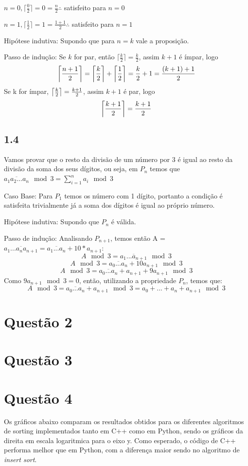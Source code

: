 \documentclass{article}
\DeclarePairedDelimiter\ceil{\lceil}{\rceil}
\begin{document}
$n=0,\lceil\frac{0}{2}\rceil=0=\frac{n}{2}\therefore$ satisfeito para $n=0$

$n=1,\lceil\frac{1}{2}\rceil=1=\frac{1+1}{2}\therefore$ satisfeito para $n=1$

Hipótese indutiva: Supondo que para $n=k$ vale a proposição.

Passo de indução: Se $k$ for par, então $\lceil\frac{k}{2} \rceil = \frac{k}{2}$, assim
$k+1$ é ímpar, logo
$$
\ceil*{\frac{n+1}{2}} = \ceil*{\frac{k}{2}} + \ceil*{\frac{1}{2}} =\frac{k}{2}+1 = \frac{(k+1)+1}{2}
$$
Se k for ímpar, $\ceil*{\frac{k}{2}} = \frac{k+1}{2}$, assim $k+1$ é par, logo
$$\ceil*{\frac{k+1}{2}}=\frac{k+1}{2}$$


\subsection*{1.4}
Vamos provar que o resto da divisão de um número por 3 é igual ao resto da divisão da soma
dos seus dígitos, ou seja, em $P_n$ temos que $\overline{a_1a_2...a_n} \mod 3 = \sum_{i=1}^n{a_i} \mod 3$

Caso Base: Para $P_1$ temos os número com 1 dígito, portanto a condição é satisfeita trivialmente já
a soma dos dígitos é igual ao próprio número.

Hipótese indutiva: Supondo que $P_n$ é válida.

Passo de indução: Analisando $P_{n+1}$, temos então A = $\overline{a_1...a_na_{n+1}} = \overline{a_1...a_n}+10*a_{n+1}$:
$$A \mod 3 = \overline{a_1...a_{n+1}} \mod 3$$
$$A \mod 3 = \overline{a_0...a_n} + 10a_{n+1} \mod 3$$
$$A \mod 3 = \overline{a_0...a_n} + a_{n+1} +9a_{n+1} \mod 3$$
Como $9a_{n+1} \mod 3 = 0$, então, utilizando a propriedade $P_n$, temos que:
$$A \mod 3 = \overline{a_0...a_n} + a_{n+1} \mod 3 = a_0 + ... + a_n + a_{n+1} \mod 3$$





\section*{Questão 2}
\section*{Questão 3}
\section*{Questão 4}

Os gráficos abaixo comparam os resultados obtidos para os diferentes algoritmos de sorting
implementados tanto em C++ como em Python, sendo os gráficos da direita em escala logaritmica para o eixo y.
Como esperado, o código de C++ performa melhor
que em Python, com a diferença maior sendo no algoritmo de {\it insert sort}.
\end{document}
